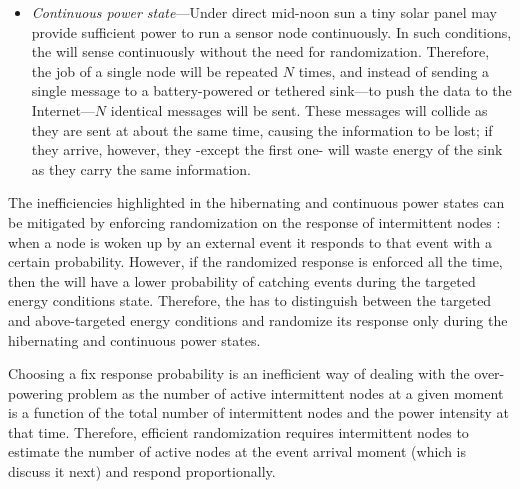\begin{itemize}
		\item \label{it:continuous} \textit{Continuous power state}---Under direct mid-noon sun a tiny solar panel may provide sufficient power to run a sensor node continuously. In such conditions, the \sys will sense continuously without the need for randomization. Therefore, the job of a single node will be repeated $N$ times, and instead of sending a single message to a battery-powered or tethered sink---to push the data to the Internet---$N$ identical messages will be sent.
		These messages will collide as they are sent at about the same time, causing the information to be lost; if they arrive, however, they -except the first one- will waste energy of the sink as they carry the same information.  
				
\end{itemize}
%
The inefficiencies highlighted in the hibernating and continuous power states can be mitigated by enforcing randomization on the response of intermittent nodes 
: when a node is woken up by an external event it responds to that event with a certain probability. However, if the randomized response is enforced all the time, then the \sys will have a lower probability of catching events during the targeted energy conditions state. Therefore, the \sys has to distinguish between the targeted and above-targeted energy conditions and randomize its response only during the hibernating and continuous power states. 

Choosing a fix response probability is an inefficient way of dealing with the over-powering problem as the number of active intermittent nodes at a given moment is a function of the total number of intermittent nodes and the power intensity at that time. Therefore, efficient randomization requires intermittent nodes to estimate the number of active nodes at the event arrival moment (which is discuss it next) and respond proportionally.

